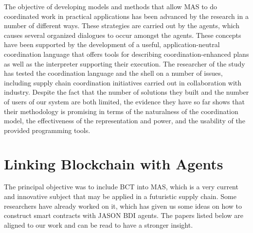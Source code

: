 \begin{itemize}
The objective of developing models and methods that allow \ac{MAS} to do coordinated work in practical applications has been advanced by the research in a number of different ways. These strategies are carried out by the agents, which causes several organized dialogues to occur amongst the agents. These concepts have been supported by the development of a useful, application-neutral coordination language that offers tools for describing coordination-enhanced plans as well as the interpreter supporting their execution. The researcher of the study has tested the coordination language and the shell on a number of issues, including supply chain coordination initiatives carried out in collaboration with industry. Despite the fact that the number of solutions they built and the number of users of our system are both limited, the evidence they have so far shows that their methodology is promising in terms of the naturalness of the coordination model, the effectiveness of the representation and power, and the usability of the provided programming tools.
\end{itemize}

\section{Linking Blockchain with Agents}

The principal objective was to include BCT into MAS, which is a very current and innovative subject that may be applied in a futuristic supply chain. Some researchers have already worked on it, which has given us some ideas on how to construct smart contracts with JASON BDI agents. The papers listed below are aligned to our work and can be read to have a stronger insight.

